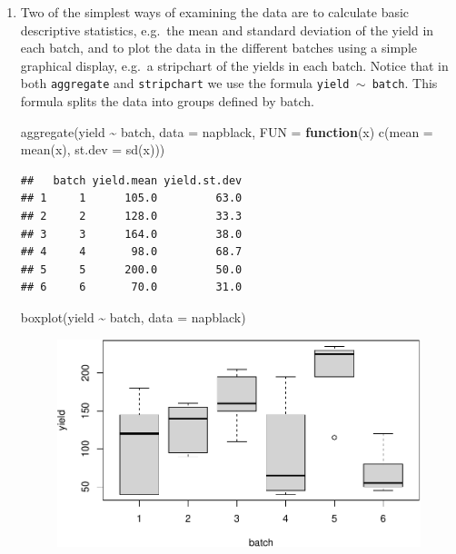 \documentclass[
]{book}
\newenvironment{Shaded}{\begin{snugshade}}{\end{snugshade}}
\newcommand{\AttributeTok}[1]{\textcolor[rgb]{0.77,0.63,0.00}{#1}}
\newcommand{\ControlFlowTok}[1]{\textcolor[rgb]{0.13,0.29,0.53}{\textbf{#1}}}
\newcommand{\FunctionTok}[1]{\textcolor[rgb]{0.00,0.00,0.00}{#1}}
\newcommand{\NormalTok}[1]{#1}
\newcommand{\SpecialCharTok}[1]{\textcolor[rgb]{0.00,0.00,0.00}{#1}}
\theoremstyle{definition}
\theoremstyle{definition}
\theoremstyle{definition}
\theoremstyle{definition}
\theoremstyle{remark}
\begin{document}
\begin{enumerate}
\def\labelenumi{\alph{enumi}.}
\item
  Two of the simplest ways of examining the data are to calculate basic descriptive statistics, e.g.~the mean and standard deviation of the yield in each batch, and to plot the data in the different batches using a simple graphical display, e.g.~a stripchart of the yields in each batch. Notice that in both \texttt{aggregate} and \texttt{stripchart} we use the formula \texttt{yield $\sim$ batch}. This formula splits the data into groups defined by batch.

\begin{Shaded}
\begin{Highlighting}[]
\FunctionTok{aggregate}\NormalTok{(yield }\SpecialCharTok{\textasciitilde{}}\NormalTok{ batch, }\AttributeTok{data =}\NormalTok{ napblack, }\AttributeTok{FUN =} \ControlFlowTok{function}\NormalTok{(x) }\FunctionTok{c}\NormalTok{(}\AttributeTok{mean =} \FunctionTok{mean}\NormalTok{(x), }
                                                          \AttributeTok{st.dev =} \FunctionTok{sd}\NormalTok{(x)))}
\end{Highlighting}
\end{Shaded}

\begin{verbatim}
##   batch yield.mean yield.st.dev
## 1     1      105.0         63.0
## 2     2      128.0         33.3
## 3     3      164.0         38.0
## 4     4       98.0         68.7
## 5     5      200.0         50.0
## 6     6       70.0         31.0
\end{verbatim}

\begin{Shaded}
\begin{Highlighting}[]
\FunctionTok{boxplot}\NormalTok{(yield }\SpecialCharTok{\textasciitilde{}}\NormalTok{ batch, }\AttributeTok{data =}\NormalTok{ napblack)}
\end{Highlighting}
\end{Shaded}

  \begin{figure}

   {\centering \includegraphics{bookdown_math3014-6027_files/figure-latex/napblack-summary-1} 

}
\end{figure}
\end{enumerate}
\end{document}
